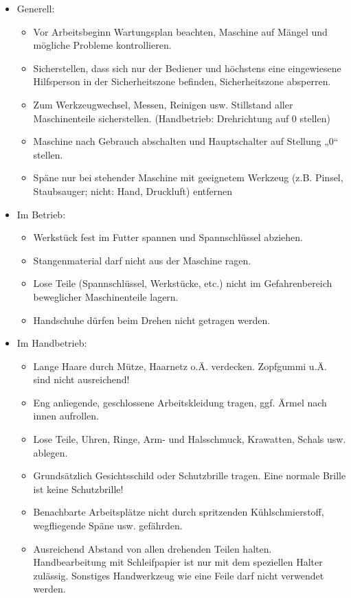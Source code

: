 \documentclass[fontsize=9pt]{scrartcl}
\newenvironment{smallitemize}{\begin{itemize}\itemsep -3pt}{\end{itemize}}
\begin{document}
\begin{itemize}
	\item Generell:
	\begin{smallitemize}
		\item Vor Arbeitsbeginn Wartungsplan beachten, Maschine auf Mängel und mögliche Probleme kontrollieren.
		\item Sicherstellen, dass sich nur der Bediener und höchstens eine eingewiesene Hilfsperson in der Sicherheitszone befinden, Sicherheitszone absperren.
		\item Zum Werkzeugwechsel, Messen, Reinigen usw. Stillstand aller Maschinenteile sicherstellen. (Handbetrieb: Drehrichtung auf 0 stellen)
		\item Maschine nach Gebrauch abschalten und Hauptschalter auf Stellung „0“ stellen.
		\item Späne nur bei stehender Maschine mit geeignetem Werkzeug (z.B. Pinsel, Staubsauger; nicht: Hand, Druckluft) entfernen
		
	\end{smallitemize}
	\item Im Betrieb:
	\begin{smallitemize}
		\item Werkstück fest im Futter spannen und Spannschlüssel abziehen.
		\item Stangenmaterial darf nicht aus der Maschine ragen.
		\item Lose Teile (Spannschlüssel, Werkstücke, etc.) nicht im Gefahrenbereich beweglicher Maschinenteile lagern.
		\item Handschuhe dürfen beim Drehen nicht getragen werden.
		
	\end{smallitemize}
	\item Im Handbetrieb:
	\begin{smallitemize}
		\item Lange Haare durch Mütze, Haarnetz o.Ä. verdecken. Zopfgummi u.Ä. sind nicht ausreichend!
		\item Eng anliegende, geschlossene Arbeitskleidung tragen, ggf. Ärmel nach innen aufrollen.
		\item Lose Teile, Uhren,  Ringe, Arm- und Halsschmuck, Krawatten, Schals usw. ablegen.
		\item Grundsätzlich Gesichtsschild oder Schutzbrille tragen. Eine normale Brille ist keine Schutzbrille!
		\item Benachbarte Arbeitsplätze nicht durch spritzenden Kühlschmierstoff, wegfliegende Späne usw. gefährden.
		\item Ausreichend Abstand von allen drehenden Teilen halten. Handbearbeitung mit Schleifpapier ist nur mit dem speziellen Halter zulässig. Sonstiges Handwerkzeug wie eine Feile darf nicht verwendet werden.
		\end{smallitemize}
\end{itemize}
\end{document}

